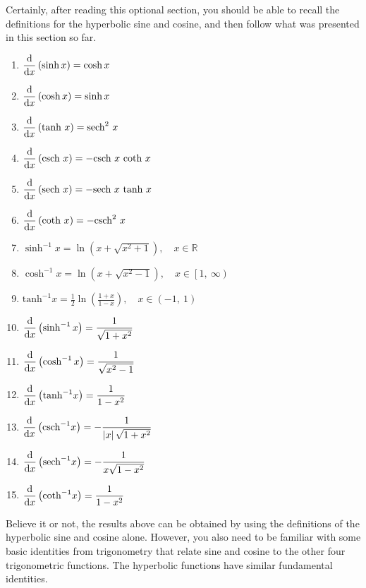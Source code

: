 \documentclass[12pt,addpoints, answers, fleqn]{exam}
\begin{document}
Certainly, after reading this optional section, you should be able to recall the definitions for the hyperbolic sine and cosine, and then follow what was presented in this section so far.
\begin{enumerate}
\item $\displaystyle \frac{{\rm{d}}}{{\rm{d}}x} \left( \sinh x \right) = \cosh x$
\item $\displaystyle \frac{{\rm{d}}}{{\rm{d}}x} \left( \cosh x \right) = \sinh x$
\item $\displaystyle \frac{{\rm{d}}}{{\rm{d}}x} \left( \mbox{tanh} \ x \right) = \mbox{sech}^2 \ x$
\item $\displaystyle \frac{{\rm{d}}}{{\rm{d}}x} \left( \mbox{csch} \ x \right) = -\mbox{csch} \ x \ \mbox{coth} \ x$
\item $\displaystyle \frac{{\rm{d}}}{{\rm{d}}x} \left( \mbox{sech} \ x \right) = -\mbox{sech} \ x \ \mbox{tanh} \ x$
\item $\displaystyle \frac{{\rm{d}}}{{\rm{d}}x} \left( \mbox{coth} \ x \right) = -\mbox{csch}^2 \ x$
\item $\displaystyle \sinh^{-1} x = \ln \left( x + \sqrt{x^2 + 1}\right), \quad x \in \mathbb{R}$
\item $\displaystyle \cosh^{-1} x = \ln \left( x + \sqrt{x^2 - 1}\right), \quad x \in \left[1, \ \infty \right)$
\item $\displaystyle \mbox{tanh}^{-1} x = \frac{1}{2} \ln \left( \frac{1+x}{1-x} \right), \quad x \in \left(-1, \ 1 \right)$
\item $\displaystyle \frac{{\rm{d}}}{{\rm{d}}x} \left( \sinh^{-1} x \right) = \frac{1}{\sqrt{1+x^2}}$
\item $\displaystyle \frac{{\rm{d}}}{{\rm{d}}x} \left( \cosh^{-1} x \right) = \frac{1}{\sqrt{x^2-1}}$
\item $\displaystyle \frac{{\rm{d}}}{{\rm{d}}x} \left( \mbox{tanh}^{-1} x \right) = \frac{1}{1-x^2}$
\item $\displaystyle \frac{{\rm{d}}}{{\rm{d}}x} \left( \mbox{csch}^{-1} x \right) = -\frac{1}{\left|x\right|\sqrt{1+x^2}}$
\item $\displaystyle \frac{{\rm{d}}}{{\rm{d}}x} \left( \mbox{sech}^{-1} x \right) = -\frac{1}{x\sqrt{1-x^2}}$
\item $\displaystyle \frac{{\rm{d}}}{{\rm{d}}x} \left( \mbox{coth}^{-1} x \right) = \frac{1}{1-x^2}$
\end{enumerate}
Believe it or not, the results above can be obtained by using the definitions of the hyperbolic sine and cosine alone. However, you also need to be familiar with some basic identities from trigonometry that relate sine and cosine to the other four trigonometric functions. The hyperbolic functions have similar fundamental identities.
\end{document}
